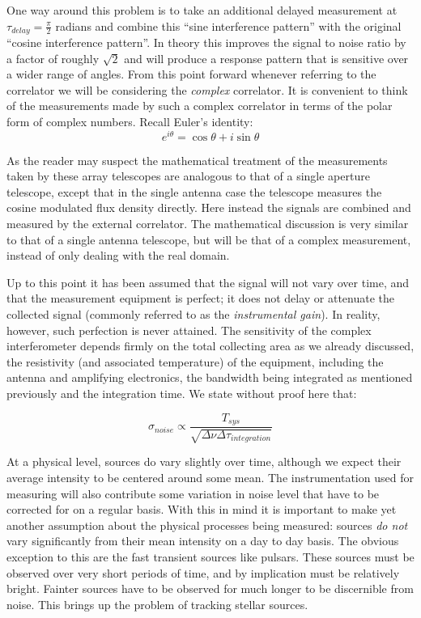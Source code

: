 One way around this problem is to take an additional delayed measurement 
at $\tau_{delay}=\frac{\pi}{2}$ radians and combine this ``sine interference pattern'' with the original 
``cosine interference pattern''. In theory this improves the signal to noise ratio by a factor of roughly $\sqrt{2}$ and will 
produce a response pattern that is sensitive over a wider range of angles. From this point forward whenever referring to the 
correlator we will be considering the \textit{complex} correlator. It is convenient to think of the measurements made by such a complex 
correlator in terms of the polar form of complex numbers. Recall Euler's identity:
\begin{equation*}
 e^{i\theta} = \cos{\theta} + i\sin{\theta}
\end{equation*}

As the reader may suspect the mathematical treatment of the measurements taken by these array telescopes are analogous
to that of a single aperture telescope, except that in the single antenna case the telescope measures the cosine modulated
flux density directly. Here instead the signals are combined and measured by the external correlator. The mathematical 
discussion is very similar to that of a single antenna telescope, but will be that of a complex measurement, 
instead of only dealing with the real domain.

Up to this point it has been assumed that the signal will not vary over time, and that the measurement equipment is perfect; it 
does not delay or attenuate the collected signal (commonly referred to as the \textit{instrumental gain}). In reality, however, 
such perfection is never attained. The sensitivity of the complex interferometer depends firmly on the total collecting area 
as we already discussed, the resistivity (and associated temperature) of the equipment, including the antenna and amplifying 
electronics, the bandwidth being integrated as mentioned previously and the integration time. We state without proof here 
that:

\begin{equation}
 \sigma_{noise} \propto \frac{T_{sys}}{\sqrt{\Delta\nu\Delta\tau_{integration}}}
\end{equation}

At a physical level, sources do vary slightly over time, although we expect their average intensity to be centered around 
some mean. The instrumentation used for measuring will also contribute some variation in noise level that have to 
be corrected for on a regular basis. With this in mind it is important to make yet another assumption about 
the physical processes being measured: sources \textit{do not} vary significantly from their mean intensity 
on a day to day basis. The obvious exception to this are the fast transient sources like pulsars. 
These sources must be observed over very short periods of time, and by implication must be relatively bright.
Fainter sources have to be observed for much longer to be discernible from noise. This brings up the problem
of tracking stellar sources.

